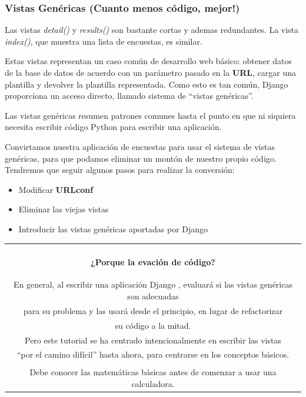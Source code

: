 \documentclass[10pt]{article}
\newcommand{\py}[1]{{\textcolor{B}{Python} #1}}
\newcommand{\django}[1]{{\textcolor{G}{Django} #1}}
\begin{document}
\subsubsection{Vistas Genéricas (Cuanto menos código, mejor!)}
Las vistas \textit{detail()} y \textit{results()} son bastante cortas y ademas redundantes.
La vista \textit{index()}, que muestra una lista de encuestas, es similar.

Estas vistas representan un caso común de desarrollo web básico: obtener datos de la base de datos de acuerdo con un parámetro pasado en la \textbf{URL}, cargar una plantilla y devolver la plantilla representada. Como esto es tan común, \django{} proporciona un acceso directo, llamado sistema de ``vistas genéricas''.

Las vistas genéricas resumen patrones comunes hasta el punto en que ni siquiera necesita escribir código \py{} para escribir una aplicación.

Convirtamos nuestra aplicación de encuestas para usar el sistema de vistas genéricas, para que podamos eliminar un montón de nuestro propio código. Tendremos que seguir algunos pasos para realizar la conversión:

\begin{itemize}
\item Modificar \textbf{URLconf}
\item Eliminar las viejas vistas
\item Introducir las vistas genéricas aportadas por \django{}
\end{itemize}


\begin{table}[H]	
	\begin{tabular}{||c||}
		\hline \\
		\begin{Large}
			\textbf{¿Porque la evación de código?}
		\end{Large}
		\\		
En general, al escribir una aplicación \django{}, evaluará si las vistas genéricas son adecuadas\\ para su problema y las usará desde el principio, en lugar de refactorizar\\ su código a la mitad.\\ Pero este tutorial se ha centrado intencionalmente en escribir las vistas \\``por el camino difícil'' hasta ahora, para centrarse en los conceptos básicos.\\\\

Debe conocer las matemáticas básicas antes de comenzar a usar una calculadora.
		\\ \hline 	
	\end{tabular}			
\end{table}		
\end{document}
